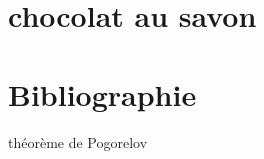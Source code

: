 \documentclass[a4paper,10pt,oneside]{article}
\begin{document}
\clearpage
\section{chocolat au savon}


\clearpage
\section*{Bibliographie}

théorème de Pogorelov \cite{ghysBrazucaBallonCubique2014}


\cite{grenierMathematiquesDiscretesMine2018}

\cite{grenierSituationsRecherchePour2017}

\cite{godotSituationsRechercheJeux2005}


  

\end{document}
